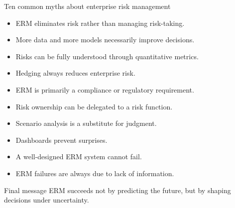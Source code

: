 \documentclass[aspectratio=169, 10pt]{beamer} %
\begin{document}
\begin{frame}{Ten common myths about enterprise risk management}

\begin{itemize}
  \item[$\bullet$] ERM eliminates risk rather than managing risk-taking.
  \item[$\bullet$] More data and more models necessarily improve decisions.
  \item[$\bullet$] Risks can be fully understood through quantitative metrics.
  \item[$\bullet$] Hedging always reduces enterprise risk.
  \item[$\bullet$] ERM is primarily a compliance or regulatory requirement.
  \item[$\bullet$] Risk ownership can be delegated to a risk function.
  \item[$\bullet$] Scenario analysis is a substitute for judgment.
  \item[$\bullet$] Dashboards prevent surprises.
  \item[$\bullet$] A well-designed ERM system cannot fail.
  \item[$\bullet$] ERM failures are always due to lack of information.
\end{itemize}

\begin{block}{Final message}
ERM succeeds not by predicting the future, but by shaping decisions under
uncertainty.
\end{block}

\end{frame}
\end{document}
